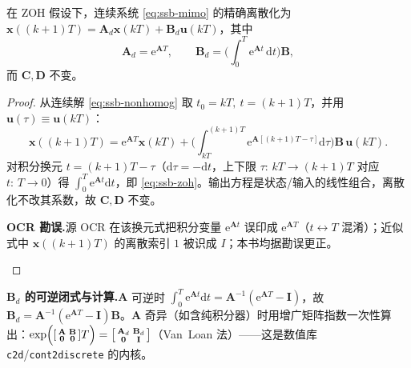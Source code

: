 \begin{theorem}[零阶保持离散化（精确）]\label{thm:ssb-zoh}
在 ZOH 假设下，连续系统 \cref{eq:ssb-mimo} 的精确离散化为 $\mathbf{x}((k+1)T)=\mathbf{A}_d\mathbf{x}(kT)+\mathbf{B}_d\mathbf{u}(kT)$，其中
\begin{equation}
  \mathbf{A}_d=\mathrm{e}^{\mathbf{A}T},\qquad \mathbf{B}_d=\Big(\int_0^T\mathrm{e}^{\mathbf{A}t}\,\mathrm{d}t\Big)\mathbf{B},
  \label{eq:ssb-zoh}
\end{equation}
而 $\mathbf{C},\mathbf{D}$ 不变。
\end{theorem}
\begin{proof}
从连续解 \cref{eq:ssb-nonhomog} 取 $t_0=kT,\ t=(k+1)T$，并用 $\mathbf{u}(\tau)\equiv\mathbf{u}(kT)$：
\[
  \mathbf{x}((k{+}1)T)=\mathrm{e}^{\mathbf{A}T}\mathbf{x}(kT)+\Big(\int_{kT}^{(k+1)T}\mathrm{e}^{\mathbf{A}[(k+1)T-\tau]}\mathrm{d}\tau\Big)\mathbf{B}\,\mathbf{u}(kT).
\]
对积分换元 $t=(k{+}1)T-\tau$（$\mathrm{d}\tau=-\mathrm{d}t$，上下限 $\tau{:}\,kT{\to}(k{+}1)T$ 对应 $t{:}\,T{\to}0$）得 $\int_0^T\mathrm{e}^{\mathbf{A}t}\mathrm{d}t$，即 \cref{eq:ssb-zoh}。输出方程是状态/输入的线性组合，离散化不改其系数，故 $\mathbf{C},\mathbf{D}$ 不变。
\begin{note}\textbf{OCR 勘误.}\;源 OCR 在该换元式把积分变量 $\mathrm{e}^{\mathbf{A}t}$ 误印成 $\mathrm{e}^{\mathbf{A}T}$（$t\leftrightarrow T$ 混淆）；近似式中 $\mathbf{x}((k{+}1)T)$ 的离散索引 $1$ 被识成 $I$；本书均据勘误更正\cite{liubao2006modern}。\end{note}
\end{proof}

\begin{note}
\textbf{$\mathbf{B}_d$ 的可逆闭式与计算.}\;$\mathbf{A}$ 可逆时 $\int_0^T\mathrm{e}^{\mathbf{A}t}\mathrm{d}t=\mathbf{A}^{-1}(\mathrm{e}^{\mathbf{A}T}-\mathbf{I})$，故 $\mathbf{B}_d=\mathbf{A}^{-1}(\mathrm{e}^{\mathbf{A}T}-\mathbf{I})\mathbf{B}$。$\mathbf{A}$ 奇异（如含纯积分器）时用增广矩阵指数一次性算出：$\exp\!\Big(\begin{bsmallmatrix}\mathbf{A}&\mathbf{B}\\\mathbf{0}&\mathbf{0}\end{bsmallmatrix}T\Big)=\begin{bsmallmatrix}\mathbf{A}_d&\mathbf{B}_d\\\mathbf{0}&\mathbf{I}\end{bsmallmatrix}$（Van~Loan 法）——这是数值库 \texttt{c2d}/\allowbreak\texttt{cont2discrete} 的内核。
\end{note}

